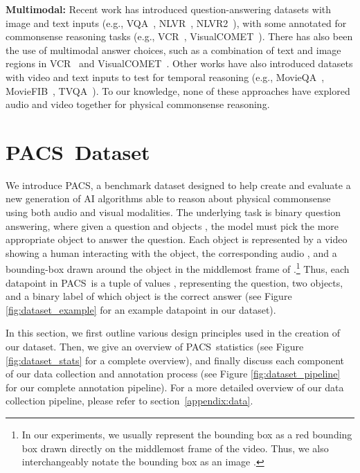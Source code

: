 \documentclass[runningheads]{llncs}
\newcommand{\names}{\textsc{PACS}}
\begin{document}
\noindent
\textbf{Multimodal:} Recent work has introduced question-answering datasets with image and text inputs (e.g., VQA~\cite{antol2015vqa}, NLVR~\cite{suhr2017nlvr}, NLVR2~\cite{suhr2019nlvr2}), with some annotated for commonsense reasoning tasks (e.g., VCR~\cite{zellers2019vcr,zellers2022merlotreserve}, VisualCOMET~\cite{park2020visualcomet}). There has also been the use of multimodal answer choices, such as a combination of text and image regions in VCR~\cite{zellers2019vcr} and VisualCOMET~\cite{park2020visualcomet}. Other works have also introduced datasets with video and text inputs to test for temporal reasoning (e.g., MovieQA~\cite{tapaswi2016movieqa}, MovieFIB~\cite{maharaj2017dataset}, TVQA~\cite{lei2018tvqa,zellers2022merlotreserve}). To our knowledge, none of these approaches have explored audio and video together for physical commonsense reasoning.


\section{\names\ Dataset}


We introduce \names, a benchmark dataset designed to help create and evaluate a new generation of AI algorithms able to reason about physical commonsense using both audio and visual modalities. The underlying task is binary question answering, where given a question  and objects , the model must pick the more appropriate object to answer the question. Each object is represented by a video  showing a human interacting with the object, the corresponding audio , and a bounding-box  drawn around the object in the middlemost frame of .\footnote{In our experiments, we usually represent the bounding box  as a red bounding box drawn directly on the middlemost frame of the video. Thus, we also interchangeably notate the bounding box as an image .} Thus, each datapoint in \names\ is a tuple of values , representing the question, two objects, and a binary label of which object is the correct answer (see Figure \ref{fig:dataset_example} for an example datapoint in our dataset).


In this section, we first outline various design principles used in the creation of our dataset. Then, we give an overview of \names\ statistics (see Figure \ref{fig:dataset_stats} for a complete overview), and finally discuss each component of our data collection and annotation process (see Figure \ref{fig:dataset_pipeline} for our complete annotation pipeline). For a more detailed overview of our data collection pipeline, please refer to section~\ref{appendix:data}.
\end{document}
